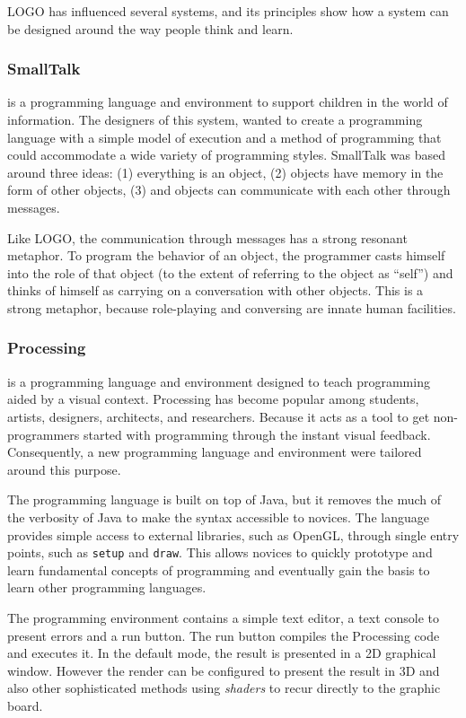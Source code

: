 LOGO has influenced several systems, and its principles show how a system can be designed around the way people think and learn.
\subsubsection{SmallTalk~\cite{Kay1993}} is a programming language and environment to support children in the world of information. The designers of this system, wanted to create a programming language with a simple model of execution and a method of programming that could accommodate a wide variety of programming styles. SmallTalk was based around three ideas: (1) everything is an object, (2) objects have memory in the form of other objects, (3) and objects can communicate with each other through messages.

Like LOGO, the communication through messages has a strong resonant metaphor. To program the behavior of an object, the programmer casts himself into the role of that object (to the extent of referring to the object as ``self'') and thinks of himself as carrying on a conversation with other objects. This is a strong metaphor, because role-playing and conversing are innate human facilities. 
\subsubsection{Processing~\cite{Reas2006}} is a programming language and environment designed to teach programming aided by a visual context. Processing has become popular among students, artists, designers, architects, and researchers. Because it acts as a tool to get non-programmers started with programming through the instant visual feedback. Consequently, a new programming language and environment were tailored around this purpose.

The programming language is built on top of Java, but it removes the much of the verbosity of Java to make the syntax accessible to novices. The language provides simple access to external libraries, such as OpenGL, through single entry points, such as \texttt{setup} and \texttt{draw}. This allows novices to quickly prototype and learn fundamental concepts of programming and eventually gain the basis to learn other programming languages.

The programming environment contains a simple text editor, a text console to present errors and a run button. The run button compiles the Processing code and executes it. In the default mode, the result is presented in a 2D graphical window. However the render can be configured to present the result in 3D and also other sophisticated methods using \textit{shaders} to recur directly to the graphic board. 

